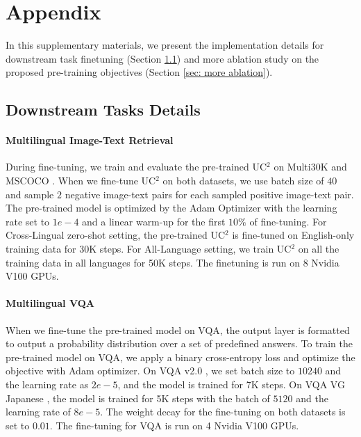 \documentclass[final]{cvpr}
\begin{document}
{\small


}

\clearpage
\appendix
\section{Appendix} \label{sec:appendix}
In this supplementary materials, we present the implementation details for downstream task finetuning (Section \ref{sec: downstream}) and more ablation study on the proposed pre-training objectives (Section \ref{sec: more ablation}). 
\subsection{Downstream Tasks Details} \label{sec: downstream}
\paragraph{Multilingual Image-Text Retrieval} 
During fine-tuning, we train and evaluate the pre-trained UC$^2$ on Multi30K \cite{multi30k, multi30k_extension_1, multi30k_extension_2} and MSCOCO \cite{MSCOCO, MSCOCO_JA, MSCOCO_ZH}. When we fine-tune UC$^2$ on both datasets, we use batch size of $40$ and sample $2$ negative image-text pairs for each sampled positive image-text pair. The pre-trained model is optimized by the Adam Optimizer with the learning rate set to $1e-4$ and  a linear warm-up for the first $10\%$ of fine-tuning. For Cross-Lingual zero-shot setting, the pre-trained UC$^2$ is fine-tuned on English-only training data for 30K steps. For All-Language setting, we train UC$^2$ on all the training data in all languages for 50K steps. The finetuning is run on 8 Nvidia V100 GPUs. 

\paragraph{Multilingual VQA}
When we fine-tune the pre-trained model on VQA, the output layer is formatted to output a probability distribution over a set of predefined answers. To train the pre-trained model on VQA, we apply a binary cross-entropy loss and optimize the objective with Adam optimizer. On VQA v2.0 \cite{vqa_v2}, we set batch size to $10240$ and the learning rate as $2e-5$, and the model is trained for 7K steps. On VQA VG Japanese \cite{vqa_ja}, the model is trained for 5K steps with the batch of $5120$ and the learning rate of $8e-5$. The weight decay for the fine-tuning on both datasets is set to $0.01$. The fine-tuning for VQA is run on 4 Nvidia V100 GPUs.
\end{document}
